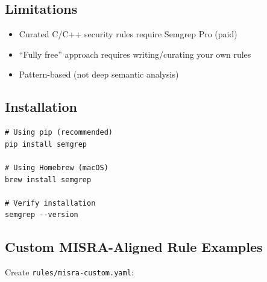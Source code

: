 \documentclass[11pt,letterpaper]{report}
\begin{document}
\subsection{Limitations}

\begin{itemize}[leftmargin=*]
    \item Curated C/C++ security rules require Semgrep Pro (paid)
    \item ``Fully free'' approach requires writing/curating your own rules
    \item Pattern-based (not deep semantic analysis)
\end{itemize}

\subsection{Installation}

\begin{lstlisting}[style=bashstyle]
# Using pip (recommended)
pip install semgrep

# Using Homebrew (macOS)
brew install semgrep

# Verify installation
semgrep --version
\end{lstlisting}

\subsection{Custom MISRA-Aligned Rule Examples}

Create \texttt{rules/misra-custom.yaml}:
\end{document}
